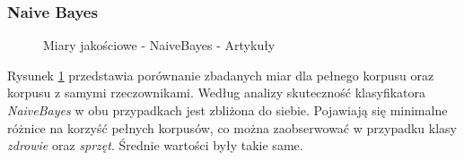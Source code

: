 \subsubsection{Naive Bayes}
\begin{figure}[ht!]
	\centering
    \qquad
	\caption{Miary jakościowe - NaiveBayes - Artykuły}
    \label{fig:report-naivebayes-articles}
\end{figure}
Rysunek \ref{fig:report-naivebayes-articles} przedstawia porównanie zbadanych miar dla pełnego korpusu oraz korpusu z samymi rzeczownikami. Według analizy skuteczność klasyfikatora \textit{NaiveBayes} w obu przypadkach jest zbliżona do siebie. Pojawiają się minimalne różnice na korzyść pełnych korpusów, co można zaobserwować w przypadku klasy \textit{zdrowie} oraz \textit{sprzęt}. Średnie wartości były takie same.

